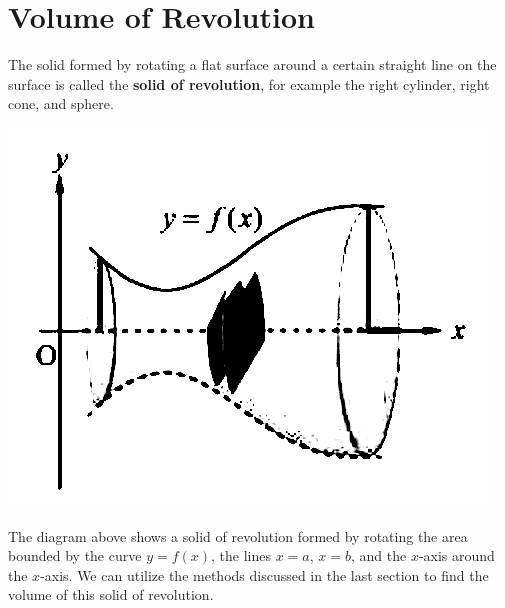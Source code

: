 \newpage




\newpage
\section{Volume of Revolution}
The solid formed by rotating a flat surface around a certain straight line on
the surface is called the \textbf{solid of revolution}, for example the right
cylinder, right cone, and sphere.

\begin{center}
    \includegraphics[scale=0.3]{assets/28-22a.png}
\end{center}

The diagram above shows a solid of revolution formed by rotating the area
bounded by the curve $y = f(x)$, the lines $x = a$, $x = b$, and the $x$-axis
around the $x$-axis. We can utilize the methods discussed in the last section
to find the volume of this solid of revolution.

